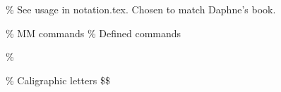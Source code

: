 \documentclass[
  letterpaper,
  DIV=11,
  numbers=noendperiod]{scrartcl}
\begin{document}
\newcommand{\parents}{Pa}

\% See usage in notation.tex. Chosen to match Daphne's book.

\DeclareMathOperator*{\argmax}{arg\,max}
\DeclareMathOperator*{\argmin}{arg\,min}

\DeclareMathOperator{\sign}{sign}
\DeclareMathOperator{\Tr}{Tr}
\let\ab\allowbreak

\% MM commands \% Defined commands \newcommand{\reals}{\mathbb{R}}
\newcommand{\sphere}{\mathbb{S}} \newcommand{\comps}{\mathbb{C}}
\newcommand{\naturals}{\mathbb{N}} \newcommand{\borel}{\mathcal{B}}
\newcommand{\defeq}{\vcentcolon=} \newcommand{\eqdef}{=\vcentcolon}
\newcommand{\expec}{\mathbb{E}} \newcommand{\prob}{\mathbb{P}}
\newcommand{\supp}{\text{supp}}

\newcommand\norm[1]{\left\lVert#1\right\rVert}

\% \newcommand{\htanh}{\ensuremath{\text{htanh}}}

\newtheorem{theorem}{Theorem}[section]
\newtheorem{corollary}{Corollary}[theorem]
\newtheorem{definition}{Definition}[section]
\newtheorem{proposition}{Proposition}

\% Caligraphic letters \newcommand{\cA}{\ensuremath{\mathcal{A}}}
\newcommand{\cN}{\ensuremath{\mathcal{N}}}
\newcommand{\cM}{\ensuremath{\mathcal{M}}}
\newcommand{\cB}{\ensuremath{\mathcal{B}}}
\newcommand{\cV}{\ensuremath{\mathcal{V}}}
\newcommand{\cC}{\ensuremath{\mathcal{C}}}
\newcommand{\cF}{\ensuremath{\mathcal{F}}}
\newcommand{\cX}{\ensuremath{\mathcal{X}}}
\newcommand{\cY}{\ensuremath{\mathcal{Y}}}
\newcommand{\cO}{\ensuremath{\mathcal{O}}}
\newcommand{\cH}{\ensuremath{\mathcal{H}}}
\newcommand{\cD}{\ensuremath{\mathcal{D}}}
\newcommand{\cL}{\ensuremath{\mathcal{L}}}
\newcommand{\cI}{\ensuremath{\mathcal{I}}}
\newcommand{\cJ}{\ensuremath{\mathcal{J}}}
\newcommand{\cS}{\ensuremath{\mathcal{S}}}
\newcommand{\cG}{\ensuremath{\mathcal{G}}}
\newcommand{\cP}{\ensuremath{\mathcal{P}}} \$\$
\end{document}

